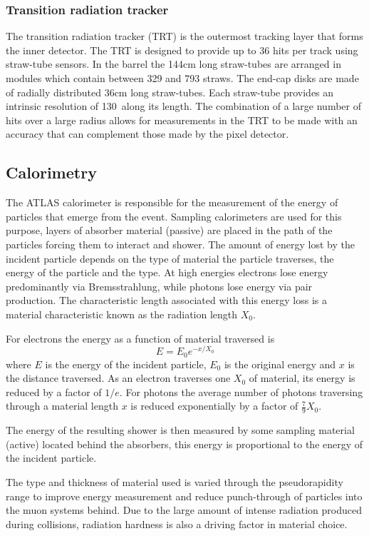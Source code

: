 \subsubsection{Transition radiation tracker}
The transition radiation tracker (TRT) is the outermost tracking layer that forms the inner detector. The TRT is designed to provide up to 36 hits per track using straw-tube sensors. In the barrel the 144cm long straw-tubes are arranged in modules which contain between 329 and 793 straws. The end-cap disks are made of radially distributed 36cm long straw-tubes. Each straw-tube provides an intrinsic resolution of 130\microm\ along its length. The combination of a large number of hits over a large radius allows for measurements in the TRT to be made with an accuracy that can complement those made by the pixel detector.

\subsection{Calorimetry}
The ATLAS calorimeter is responsible for the measurement of the energy of particles that emerge from the event. Sampling calorimeters are used for this purpose, layers of absorber material (passive) are placed in the path of the particles forcing them to interact and shower. The amount of energy lost by the incident particle depends on the type of material the particle traverses, the energy of the particle and the type. At high energies electrons lose energy predominantly via Bremsstrahlung, while photons lose energy via pair production. The characteristic length associated with this energy loss is a material characteristic known as the radiation length $X_0$.

For electrons the energy as a function of material traversed is 
%
\begin{equation}
  E=E_0e^{-x/X_0}
\end{equation}
%
where $E$ is the energy of the incident particle, $E_0$ is the original energy and $x$ is the distance traversed. As an electron traverses one $X_0$ of material, its energy is reduced by a factor of $1/e$. For photons the average number of photons traversing through a material length $x$ is reduced exponentially by a factor of $\frac{7}{9}X_0$.

The energy of the resulting shower is then measured by some sampling material (active) located behind the absorbers, this energy is proportional to the energy of the incident particle.

The type and thickness of material used is varied through the pseudorapidity range to improve energy measurement and reduce punch-through of particles into the muon systems behind. Due to the large amount of intense radiation produced during collisions, radiation hardness is also a driving factor in material choice.

